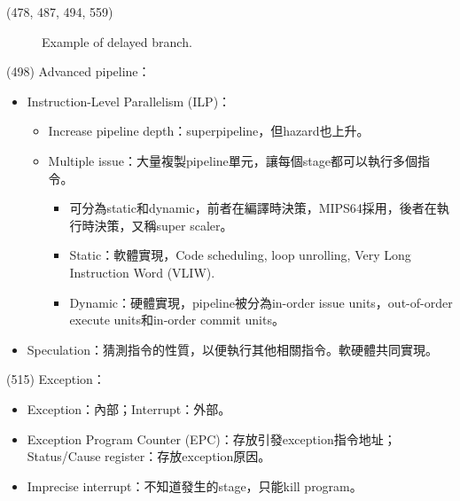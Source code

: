 \begin{theorem}{(478, 487, 494, 559)}
\begin{itemize}
\begin{itemize}
\begin{figure}[H]
                \caption{Example of delayed branch.}
                \label{img:delayed-branch}
            \end{figure}
        \end{itemize}
    \end{itemize}
\end{theorem}

\item \begin{theorem}{(498)} Advanced pipeline：\begin{itemize}
        \item Instruction-Level Parallelism (ILP)：\begin{itemize}
            \item Increase pipeline depth：superpipeline，但hazard也上升。
            \item Multiple issue：大量複製pipeline單元，讓每個stage都可以執行多個指令。\begin{itemize}
                \item 可分為static和dynamic，前者在編譯時決策，MIPS64採用，後者在執行時決策，又稱super scaler。
                \item Static：軟體實現，Code scheduling, loop unrolling, Very Long Instruction Word (VLIW).
                \item Dynamic：硬體實現，pipeline被分為in-order issue units，out-of-order execute units和in-order commit units。
            \end{itemize}
        \end{itemize}
        \item Speculation：猜測指令的性質，以便執行其他相關指令。軟硬體共同實現。
    \end{itemize}
\end{theorem}

\item \begin{theorem}{(515)} Exception：\begin{itemize}
        \item Exception：內部；Interrupt：外部。
        \item Exception Program Counter (EPC)：存放引發exception指令地址；Status/Cause register：存放exception原因。
        \item Imprecise interrupt：不知道發生的stage，只能kill program。
    \end{itemize}
\end{theorem}
